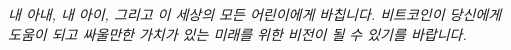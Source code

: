 
\newpage \vspace*{8cm}
\thispagestyle{empty}
\begin{center}
  \Large \emph{
  내 아내, 내 아이, 그리고 이 세상의 모든 어린이에게 바칩니다.
  비트코인이 당신에게 도움이 되고 싸울만한 가치가 있는 미래를 위한 비전이 될 수 있기를 바랍니다.
  }
\end{center}
